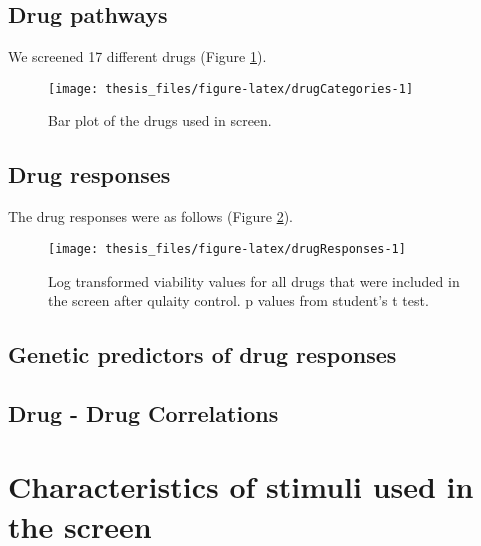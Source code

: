 \documentclass[11pt, a4paper, twosided]{book}
\begin{document}
\hypertarget{drug-pathways}{%
\subsection{Drug pathways}\label{drug-pathways}}

We screened 17 different drugs (Figure \ref{fig:drugCategories}).


\begin{figure}

{\centering \texttt{[image: thesis\_files/figure-latex/drugCategories-1]} 

}

\caption{Bar plot of the drugs used in screen.}\label{fig:drugCategories}
\end{figure}
\hypertarget{drug-responses}{%
\subsection{Drug responses}\label{drug-responses}}

The drug responses were as follows (Figure \ref{fig:drugResponses}).


\begin{figure}

{\centering \texttt{[image: thesis\_files/figure-latex/drugResponses-1]} 

}

\caption{Log transformed viability values for all drugs that were included in the screen after qulaity control. p values from student's t test.}\label{fig:drugResponses}
\end{figure}
\hypertarget{genetic-predictors-of-drug-responses}{%
\subsection{Genetic predictors of drug responses}\label{genetic-predictors-of-drug-responses}}

\hypertarget{drug---drug-correlations}{%
\subsection{Drug - Drug Correlations}\label{drug---drug-correlations}}

\hypertarget{characteristics-of-stimuli-used-in-the-screen}{%
\section{Characteristics of stimuli used in the screen}\label{characteristics-of-stimuli-used-in-the-screen}}
\end{document}

